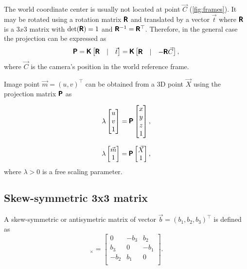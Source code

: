 The world coordinate center is usually not located at point $\vec{C}$ (\autoref{fig:frames}). 
It may be rotated using a rotation matrix $\pmb{\mathsf{R}}$ and translated by a vector $\vec{t}$ where $\pmb{\mathsf{R}}$ is a $3x3$ matrix with $\det(\pmb{\mathsf{R}}) = 1$ and $\pmb{\mathsf{R}}^{-1} = \pmb{\mathsf{R}}^\top$. 
Therefore, in the general case the projection can be expressed as
\begin{equation}
    \label{eq:PKRt}
    \pmb{\mathsf{P}} = \pmb{\mathsf{K}} \begin{bmatrix} \pmb{\mathsf{R}} & | & \vec{t} \end{bmatrix} = 
    \pmb{\mathsf{K}} \begin{bmatrix} \pmb{\mathsf{R}} & | & - \pmb{\mathsf{R}} \vec{C} \end{bmatrix},
\end{equation}
where $\vec{C}$ is the camera's position in the world reference frame. 

Image point $\vec{m} = (u, v)^\top$ can be obtained from a 3D point $\vec{X}$ using the projection matrix $\pmb{\mathsf{P}}$ as

\begin{equation}
    \label{eq:projection}
    \lambda \begin{bmatrix} 
        u \\ v \\ 1 \end{bmatrix} = \pmb{\mathsf{P}} \begin{bmatrix} x \\ y \\ z \\ 1
    \end{bmatrix},
\end{equation}

\begin{equation}
    \label{eq:proj_min}
    \lambda 
    \begin{bmatrix} 
    \vec{m} \\ 1 \end{bmatrix} = \pmb{\mathsf{P}} \begin{bmatrix} \vec{X} \\ 1
    \end{bmatrix},
\end{equation}
where $\lambda > 0$ is a free scaling parameter.

\subsection{Skew-symmetric 3x3 matrix}
A skew-symmetric or antisymetric matrix of vector $\vec{b} = (b_1, b_2, b_3)^\top$ is defined as
\begin{equation}
    [\vec{b}]_{\times} = \begin{bmatrix}
        0 & -b_3 & b_2 \\ 
        b_3 & 0 & -b_1 \\ 
        -b_2 & b_1 & 0 \\ 
    \end{bmatrix}.
\end{equation}

